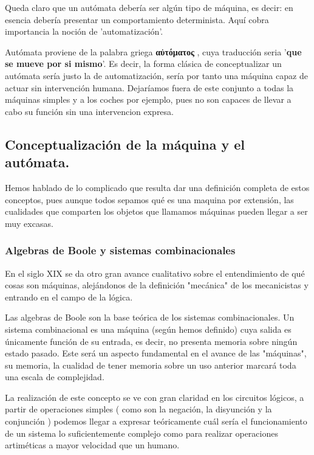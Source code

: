 Queda claro que un autómata debería ser algún tipo de máquina, es decir: en esencia debería presentar un comportamiento determinista. Aquí cobra importancia la noción de 'automatización'.

Autómata proviene de la palabra griega \textbf{\textgreek{αὐτόματος}} , cuya traducción seria '\textbf{que se mueve por si mismo}'. Es decir, la forma clásica de conceptualizar un autómata sería justo la de automatización, sería por tanto una máquina capaz de actuar sin intervención humana. Dejaríamos fuera de este conjunto a todas la máquinas simples y a los coches por ejemplo, pues no son capaces de llevar a cabo su función sin una intervencion expresa.




\subsection{ Conceptualización de la máquina y el autómata.}

Hemos hablado de lo complicado que resulta dar una definición completa de estos conceptos, pues aunque todos sepamos qué es una maquina por extensión, las cualidades que comparten los objetos que llamamos máquinas pueden llegar a ser muy excasas.

\subsubsection{ Algebras de Boole y sistemas combinacionales}

En el siglo XIX se da otro gran avance cualitativo sobre el entendimiento de qué cosas son máquinas, alejándonos de la definición "mecánica" de los mecanicistas y entrando en el campo de la lógica.

Las algebras de Boole son la base teórica de los sistemas combinacionales. Un sistema combinacional es una máquina (según hemos definido) cuya salida es únicamente función de su entrada, es decir, no presenta memoria sobre ningún estado pasado. Este será un aspecto fundamental en el avance de las "máquinas", su memoria, la cualidad de tener memoria sobre un uso anterior marcará toda una escala de complejidad.


La realización de este concepto se ve con gran claridad en los circuitos lógicos, a partir de operaciones simples ( como son la negación, la disyunción y la conjunción ) podemos llegar a expresar teóricamente cuál sería el funcionamiento de un sistema lo suficientemente complejo como para realizar operaciones artiméticas a mayor velocidad que un humano.

